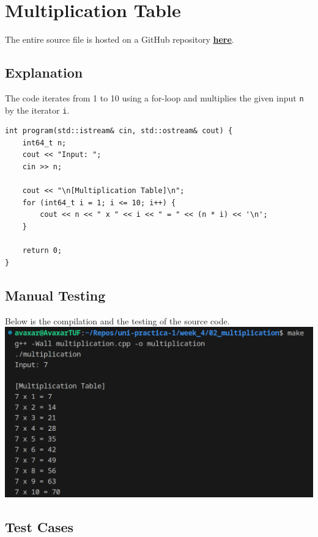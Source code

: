 \documentclass[12pt]{article}
\begin{document}
\pagebreak
\section{Multiplication Table}
The entire source file is hosted on a GitHub repository \href{https://github.com/avaxar/uni-practica-1/tree/main/week_4/02_multiplication}{\textbf{here}}.

\subsection{Explanation}

The code iterates from 1 to 10 using a for-loop and multiplies the given input \texttt{n} by the iterator \texttt{i}.

\begin{verbatim}
int program(std::istream& cin, std::ostream& cout) {
    int64_t n;
    cout << "Input: ";
    cin >> n;

    cout << "\n[Multiplication Table]\n";
    for (int64_t i = 1; i <= 10; i++) {
        cout << n << " x " << i << " = " << (n * i) << '\n';
    }

    return 0;
}
\end{verbatim}

\subsection{Manual Testing}
Below is the compilation and the testing of the source code.
\newline\includegraphics[width=\textwidth]{02_multiplication}

\subsection{Test Cases}
\end{document}
